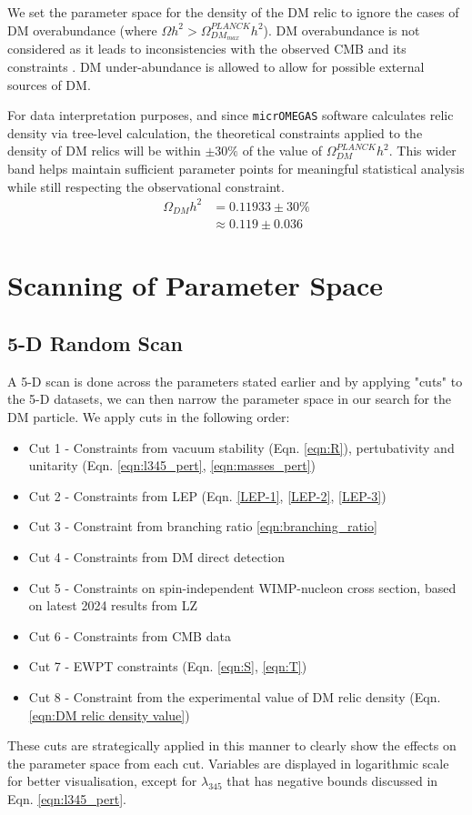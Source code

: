 \documentclass[12pt]{article}
\begin{document}
We set the parameter space for the density of the DM relic to ignore the cases of DM overabundance (where $\Omega h^2 > \Omega^{PLANCK}_{DM_{max}}h^2$). DM overabundance is not considered as it leads to inconsistencies with the observed CMB and its constraints \cite{Croon_2024, Zavala_2010}. DM under-abundance is allowed to allow for possible external sources of DM.

For data interpretation purposes, and since \verb|micrOMEGAS| software calculates relic density via tree-level calculation, the theoretical constraints applied to the density of DM relics will be within $\pm30\%$ of the value of $\Omega ^{PLANCK}_{DM} h^2$. This wider band helps maintain sufficient parameter points for meaningful statistical analysis while still respecting the observational constraint.
\begin{equation}
    \begin{split}
        \Omega_{DM} h^2 &= 0.11933 \pm 30\% \\
        &\approx 0.119 \pm 0.036 
    \end{split}
    \label{eqn:DM relic density value}
\end{equation}

\newpage
\section{Scanning of Parameter Space}
\label{sec:results}
\subsection{5-D Random Scan}
\label{5-D scan}
A 5-D scan is done across the parameters stated earlier and by applying "cuts" to the 5-D datasets, we can then narrow the parameter space in our search for the DM particle.
We apply cuts in the following order:
\begin{itemize}
    \item Cut 1 - Constraints from vacuum stability (Eqn. \ref{eqn:R}), pertubativity and unitarity (Eqn. \ref{eqn:l345_pert}, \ref{eqn:masses_pert}) 
    \item Cut 2 - Constraints from LEP (Eqn. \ref{LEP-1}, \ref{LEP-2}, \ref{LEP-3}) 
    \item Cut 3 - Constraint from branching ratio \ref{eqn:branching_ratio}
    \item Cut 4 - Constraints from DM direct detection
    \item Cut 5 - Constraints on spin-independent WIMP-nucleon cross section, based on latest 2024 results from LZ \cite{aalbers2024darkmattersearchresults}
    \item Cut 6 - Constraints from CMB data
    \item Cut 7 - EWPT constraints (Eqn. \ref{eqn:S}, \ref{eqn:T})
    \item Cut 8 - Constraint from the experimental value of DM relic density (Eqn. \ref{eqn:DM relic density value})
\end{itemize}
These cuts are strategically applied in this manner to clearly show the effects on the parameter space from each cut. Variables are displayed in logarithmic scale for better visualisation, except for $\lambda_{345}$ that has negative bounds discussed in Eqn. \ref{eqn:l345_pert}.
\newpage
\end{document}
